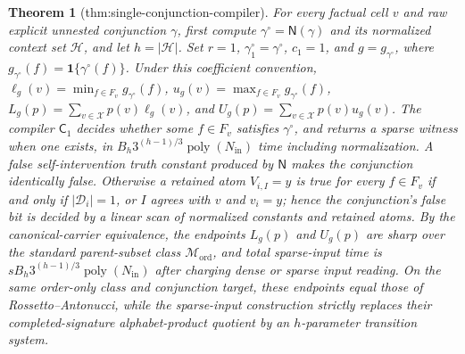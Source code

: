 \documentclass{article}
\newtheorem{theorem}{Theorem}
\begin{document}
\begin{theorem}[thm:single-conjunction-compiler]\label{thm:single-conjunction-compiler}
For every factual cell \(v\) and raw explicit unnested conjunction \(\gamma\), first compute \(\gamma^{\circ}=\mathsf N(\gamma)\) and its normalized context set \(\mathcal H\), and let \(h=|\mathcal H|\). Set \(r=1\), \(\gamma_1^{\circ}=\gamma^{\circ}\), \(c_1=1\), and \(g=g_{\gamma^{\circ}}\), where \(g_{\gamma^{\circ}}(f)=\mathbf 1\{\gamma^{\circ}(f)\}\). Under this coefficient convention, \(\ell_g(v)=\min_{f\in F_v}g_{\gamma^{\circ}}(f)\), \(u_g(v)=\max_{f\in F_v}g_{\gamma^{\circ}}(f)\), \(L_g(p)=\sum_{v\in\mathcal X}p(v)\ell_g(v)\), and \(U_g(p)=\sum_{v\in\mathcal X}p(v)u_g(v)\). The compiler \(\mathsf C_1\) decides whether some \(f\in F_v\) satisfies \(\gamma^{\circ}\), and returns a sparse witness when one exists, in \(B_h3^{(h-1)/3}\operatorname{poly}(N_{\mathrm{in}})\) time including normalization. A false self-intervention truth constant produced by \(\mathsf N\) makes the conjunction identically false. Otherwise a retained atom \(V_{i,I}=y\) is true for every \(f\in F_v\) if and only if \( |\mathcal D_i|=1\), or \(I\) agrees with \(v\) and \(v_i=y\); hence the conjunction's false bit is decided by a linear scan of normalized constants and retained atoms. By the canonical-carrier equivalence, the endpoints \(L_g(p)\) and \(U_g(p)\) are sharp over the standard parent-subset class \(\mathcal M_{\mathrm{ord}}\), and total sparse-input time is \(sB_h3^{(h-1)/3}\operatorname{poly}(N_{\mathrm{in}})\) after charging dense or sparse input reading. On the same order-only class and conjunction target, these endpoints equal those of Rossetto--Antonucci, while the sparse-input construction strictly replaces their completed-signature alphabet-product quotient by an \(h\)-parameter transition system.
\end{theorem}
\end{document}
